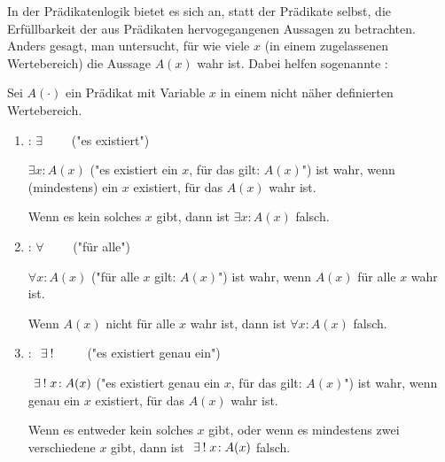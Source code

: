 In der Prädikatenlogik bietet es sich an, statt der Prädikate selbst, die Erfüllbarkeit der aus Prädikaten hervogegangenen Aussagen zu betrachten. Anders gesagt, man untersucht, für wie viele $x$ (in einem zugelassenen Wertebereich) die Aussage $A(x)$ wahr ist. Dabei helfen sogenannte :

\begin{definition}[Quantoren]
    \label{def-quantors}
    Sei $A(\cdot)$ ein Prädikat mit Variable $x$ in einem nicht näher definierten Wertebereich.
    \begin{enumerate}
        \item {}: $\exists \qquad$ ("es existiert")

        $\exists x\!: A(x)$ ("es existiert ein $x$, für das gilt: $A(x)$") ist wahr, wenn (mindestens) ein $x$ existiert, für das $A(x)$ wahr ist.
        
        Wenn es kein solches $x$ gibt, dann ist $\exists x\!: A(x)$ falsch.
        \item {}: $\forall \qquad$ ("für alle")

        $\forall x\!: A(x)$ ("für alle $x$ gilt: $A(x)$") ist wahr, wenn $A(x)$ für alle $x$ wahr ist.

        Wenn $A(x)$ nicht für alle $x$ wahr ist, dann ist $\forall x\!: A(x)$ falsch.
        \item {}: $\existsone \qquad$ ("es existiert genau ein")

        $\existsone x\!: A(x)$ ("es existiert genau ein $x$, für das gilt: $A(x)$") ist wahr, wenn genau ein $x$ existiert, für das $A(x)$ wahr ist.

        Wenn es entweder kein solches $x$ gibt, oder wenn es mindestens zwei verschiedene $x$ gibt, dann ist $\existsone x\!: A(x)$ falsch.
    \end{enumerate}
\end{definition}

